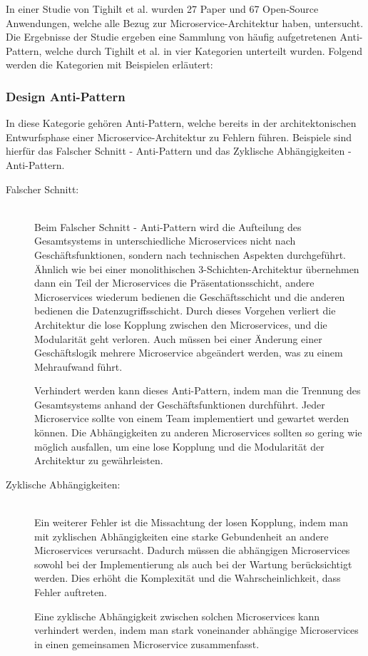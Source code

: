 In einer Studie von Tighilt et al. \cite{Tighilt.072020} wurden 27 Paper und 67 Open-Source Anwendungen, welche alle Bezug zur Microservice-Architektur haben, untersucht. Die Ergebnisse der Studie \cite{Tighilt.072020} ergeben eine Sammlung von häufig aufgetretenen Anti-Pattern, welche durch Tighilt et al. in vier Kategorien unterteilt wurden. Folgend werden die Kategorien mit Beispielen erläutert:

\subsubsection*{Design Anti-Pattern}

In diese Kategorie gehören Anti-Pattern, welche bereits in der architektonischen Entwurfsphase einer Microservice-Architektur zu Fehlern führen. Beispiele sind hierfür das \glqq Falscher Schnitt\grqq{} - Anti-Pattern und das \glqq Zyklische Abhängigkeiten\grqq{} - Anti-Pattern.

\begin{description}
    \item[Falscher Schnitt:]\hfill \\
    Beim \glqq Falscher Schnitt\grqq{} - Anti-Pattern wird die Aufteilung des Gesamtsystems in unterschiedliche Microservices nicht nach Geschäftsfunktionen, sondern nach technischen Aspekten durchgeführt. Ähnlich wie bei einer monolithischen 3-Schichten-Architektur übernehmen dann ein Teil der Microservices die Präsentationsschicht, andere Microservices wiederum bedienen die Geschäftsschicht und die anderen bedienen die Datenzugriffsschicht. Durch dieses Vorgehen verliert die Architektur die lose Kopplung zwischen den Microservices, und die Modularität geht verloren. Auch müssen bei einer Änderung einer Geschäftslogik mehrere Microservice abgeändert werden, was zu einem Mehraufwand führt.

    Verhindert werden kann dieses Anti-Pattern, indem man die Trennung des Gesamtsystems anhand der Geschäftsfunktionen durchführt. Jeder Microservice sollte von einem Team implementiert und gewartet werden können. Die Abhängigkeiten zu anderen Microservices sollten so gering wie möglich ausfallen, um eine lose Kopplung und die Modularität der Architektur zu gewährleisten.
    
    \item[Zyklische Abhängigkeiten:]\hfill \\
    Ein weiterer Fehler ist die Missachtung der losen Kopplung, indem man mit zyklischen Abhängigkeiten eine starke Gebundenheit an andere Microservices verursacht. Dadurch müssen die abhängigen Microservices sowohl bei der Implementierung als auch bei der Wartung berücksichtigt werden. Dies erhöht die Komplexität und die Wahrscheinlichkeit, dass Fehler auftreten.

    Eine zyklische Abhängigkeit zwischen solchen Microservices kann verhindert werden, indem man stark voneinander abhängige Microservices in einen gemeinsamen Microservice zusammenfasst. 

\end{description}

